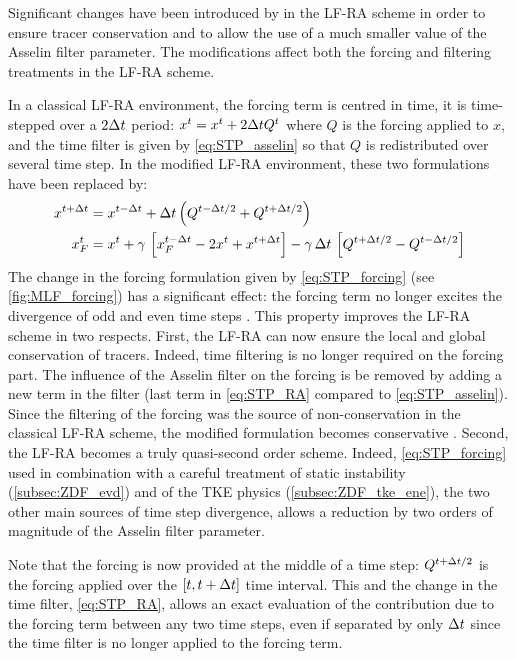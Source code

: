 \documentclass[../main/NEMO_manual]{subfiles}
\begin{document}
Significant changes have been introduced by \cite{Leclair_Madec_OM09} in the LF-RA scheme in order to ensure tracer conservation and to allow the use of a much smaller value of the Asselin filter parameter.
The modifications affect both the forcing and filtering treatments in the LF-RA scheme.

In a classical LF-RA environment, the forcing term is centred in time,
\ie it is time-stepped over a $2\Delta t$ period:
$x^t  = x^t + 2\Delta t Q^t $ where $Q$ is the forcing applied to $x$,
and the time filter is given by \autoref{eq:STP_asselin} so that $Q$ is redistributed over several time step.
In the modified LF-RA environment, these two formulations have been replaced by:
\begin{align}
  x^{t+\Delta t}  &= x^{t-\Delta t} + \Delta t \left( Q^{t-\Delta t/2} + Q^{t+\Delta t/2} \right)                   \label{eq:STP_forcing} \\
  x_F^t  &= x^t + \gamma \, \left[ x_F^{t-\Delta t} - 2 x^t + x^{t+\Delta t} \right]
           - \gamma\,\Delta t \, \left[ Q^{t+\Delta t/2} -  Q^{t-\Delta t/2} \right]                          \label{eq:STP_RA}
\end{align}
The change in the forcing formulation given by \autoref{eq:STP_forcing} (see \autoref{fig:MLF_forcing})
has a significant effect:
the forcing term no longer excites the divergence of odd and even time steps \citep{Leclair_Madec_OM09}. 
This property improves the LF-RA scheme in two respects.
First, the LF-RA can now ensure the local and global conservation of tracers.
Indeed, time filtering is no longer required on the forcing part.
The influence of the Asselin filter on the forcing is be removed by adding a new term in the filter
(last term in \autoref{eq:STP_RA} compared to \autoref{eq:STP_asselin}).
Since the filtering of the forcing was the source of non-conservation in the classical LF-RA scheme,
the modified formulation becomes conservative \citep{Leclair_Madec_OM09}.
Second, the LF-RA becomes a truly quasi-second order scheme.
Indeed, \autoref{eq:STP_forcing} used in combination with a careful treatment of static instability
(\autoref{subsec:ZDF_evd}) and of the TKE physics (\autoref{subsec:ZDF_tke_ene}),
the two other main sources of time step divergence,
allows a reduction by two orders of magnitude of the Asselin filter parameter. 

Note that the forcing is now provided at the middle of a time step:
$Q^{t+\Delta t/2}$ is the forcing applied over the $[t,t+\Delta t]$ time interval.
This and the change in the time filter, \autoref{eq:STP_RA},
allows an exact evaluation of the contribution due to the forcing term between any two time steps,
even if separated by only $\Delta t$ since the time filter is no longer applied to the forcing term.
\end{document}
